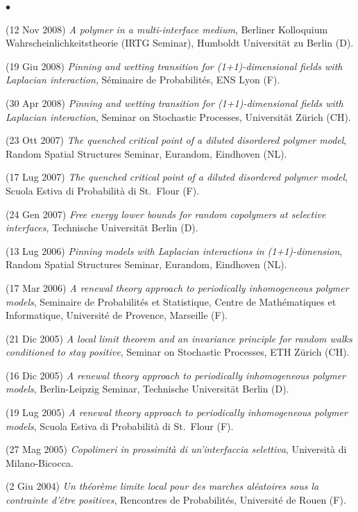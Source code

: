 \documentclass[a4paper,11pt,oneside]{amsart}
\newenvironment{myitemize}{%
\begin{list}{$\bullet$}%
 	{%
	\setlength{\itemsep}{0.3em}%
	\setlength{\topsep}{0.3em}%
	\setlength{\partopsep}{0em}%
	\setlength{\parsep}{0em}%
	\setlength{\parskip}{0em}%
	\setlength\leftmargin{1.5em}%
	\setlength\labelwidth{1.1em}%
	\setlength{\labelsep}{0.4em}%
	}%
	}%
{\end{list}}
\renewenvironment{itemize}{
\begin{myitemize}}%
{\end{myitemize}}
\begin{document}
\begin{itemize}
\item (12 Nov 2008)
\textit{A polymer in a multi-interface medium},
Berliner Kolloquium Wahr\-schein\-lich\-keits\-theo\-rie
(IRTG Seminar), Humboldt Universit\"at zu Berlin (D).

\item (19 Giu 2008)
\textit{Pinning and wetting transition for
(1+1)-dimensional fields with Laplacian interaction},
Séminaire de Probabilités, ENS Lyon (F).

\item (30 Apr 2008)
\textit{Pinning and wetting transition for
(1+1)-dimensional fields with Laplacian interaction},
Seminar on Stochastic Processes, Universit\"at Z\"urich (CH).

\item (23 Ott 2007)
\textit{The quenched critical point of a diluted disordered polymer model},
Random Spatial Structures Seminar, Eurandom, Eindhoven (NL).

\item (17 Lug 2007)
\textit{The quenched critical point of a diluted disordered polymer model},
Scuola Estiva di Probabilità di St.~Flour (F).

\item (24 Gen 2007)
\textit{Free energy lower bounds for random copolymers at selective interfaces},
Technische Universit\"at Berlin (D).

\item (13 Lug 2006)
\textit{Pinning models with Laplacian interactions in (1+1)-dimension},
Random Spatial Structures Seminar, Eurandom, Eindhoven (NL).

\item (17 Mar 2006)
\textit{A renewal theory approach to periodically inhomogeneous polymer models},
Seminaire de Probabilités et Statistique,
Centre de Mathématiques et Informatique,
Université de Provence, Marseille (F).

\item (21 Dic 2005)
\textit{A local limit theorem and an invariance principle
for random walks conditioned to stay positive},
Seminar on Stochastic Processes, ETH Z\"urich (CH).

\item (16 Dic 2005)
\textit{A renewal theory approach to periodically inhomogeneous polymer models},
Berlin-Leipzig Seminar, Technische Universit\"at Berlin (D).

\item (19 Lug 2005)
\textit{A renewal theory approach to periodically inhomogeneous polymer models},
Scuola Estiva di Probabilità di St.~Flour (F).

\item (27 Mag 2005)
\textit{Copolimeri in prossimità di un'interfaccia selettiva},
Università di Milano-Bicocca.

\item (2 Giu 2004)
\textit{Un théorème limite local pour des marches aléatoires 
sous la contrainte d'\^etre positives},
Rencontres de Probabilités, Université de Rouen (F).
\end{itemize}
\end{document}
